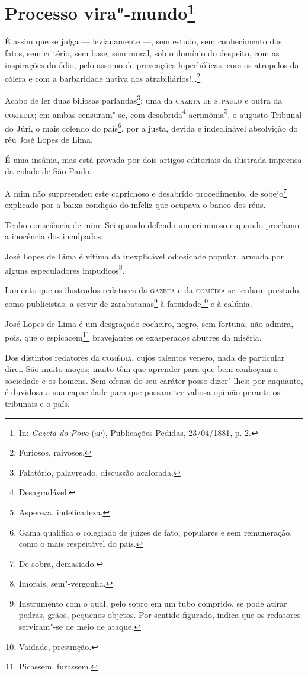 \chapter{Processo vira"-mundo\footnote[*]{In: \emph{Gazeta do Povo}
  (\textsc{sp}), Publicações Pedidas, 23/04/1881, p. 2.}}

É assim que se julga --- levianamente ---, sem estudo, sem
conhecimento dos fatos, sem critério, sem base, sem moral, sob o domínio
do despeito, com as inspirações do ódio, pelo assomo de prevenções
hiperbólicas, com os atropelos da cólera e com a barbaridade nativa dos
atrabiliários!\ldots{}\footnote{Furiosos, raivosos.}

Acabo de ler duas biliosas parlandas\footnote{Falatório, palavreado,
  discussão acalorada.}: uma da \textsc{gazeta de s.\,paulo} e outra da
\textsc{comédia}; em ambas censuram"-se, com desabrida\footnote{
  Desagradável.} acrimônia\footnote{Aspereza, indelicadeza.}, o
augusto Tribunal do Júri, o mais colendo do país\footnote{Gama
  qualifica o colegiado de juízes de fato, populares e sem remuneração,
  como o mais respeitável do país.}, por a justa, devida e indeclinável
absolvição do réu José Lopes de Lima.

É uma insânia, mas está provada por dois artigos editoriais da ilustrada
imprensa da cidade de São Paulo.

A mim não surpreendeu este caprichoso e desabrido procedimento, de
sobejo\footnote{De sobra, demasiado.} explicado por a baixa condição
do infeliz que ocupava o banco dos réus.

Tenho consciência de mim. Sei quando defendo um criminoso e quando
proclamo a inocência dos inculpados.

José Lopes de Lima é vítima da inexplicável odiosidade popular, armada
por alguns especuladores impudicos\footnote{Imorais, sem"-vergonha.}.

Lamento que os ilustrados redatores da \textsc{gazeta} e da \textsc{comédia}
se tenham prestado, como publicistas, a servir de zarabatanas\footnote{
  Instrumento com o qual, pelo sopro em um tubo comprido, se pode atirar
  pedras, grãos, pequenos objetos. Por sentido figurado, indica que os
  redatores serviram"-se de meio de ataque.} à fatuidade\footnote{
  Vaidade, presunção.} e à calúnia.

José Lopes de Lima é um desgraçado cocheiro, negro, sem fortuna; não
admira, pois, que o espicacem\footnote{Picassem, furassem.}
bravejantes os exasperados abutres da miséria.

Dos distintos redatores da \textsc{comédia}, cujos talentos venero, nada
de particular direi. São muito moços; muito têm que aprender para que
bem conheçam a sociedade e os homens. Sem ofensa do seu caráter posso
dizer"-lhes: por enquanto, é duvidosa a sua capacidade para que possam
ter valiosa opinião perante os tribunais e o país.

